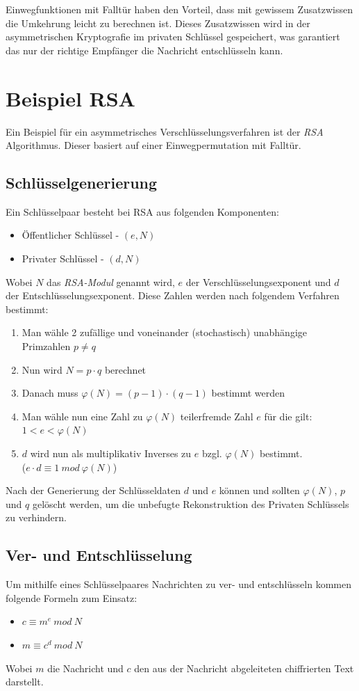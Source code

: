 \documentclass[11pt,a4paper]{scrreprt}
\begin{document}
Einwegfunktionen mit Falltür haben den Vorteil, dass mit gewissem Zusatzwissen die Umkehrung leicht zu berechnen ist. Dieses Zusatzwissen wird in der asymmetrischen Kryptografie im privaten Schlüssel gespeichert, was garantiert das nur der richtige Empfänger die Nachricht entschlüsseln kann.


\section{Beispiel RSA}
Ein Beispiel für ein asymmetrisches Verschlüsselungsverfahren ist der \textit{RSA} Algorithmus. Dieser basiert auf einer Einwegpermutation mit Falltür. 

\subsection{Schlüsselgenerierung}
Ein Schlüsselpaar besteht bei RSA aus folgenden Komponenten:
\begin{itemize}
\item Öffentlicher Schlüssel - $(e,N)$
\item Privater Schlüssel - $(d,N)$
\end{itemize}

Wobei $N$ das \textit{RSA-Modul} genannt wird, $e$ der Verschlüsselungsexponent und $d$ der Entschlüsselungsexponent. Diese Zahlen werden nach folgendem Verfahren bestimmt:
\begin{enumerate}
\item Man wähle 2 zufällige und voneinander (stochastisch) unabhängige Primzahlen $p\neq q$
\item Nun wird $N = p \cdot q$ berechnet
\item Danach muss $\varphi(N) = (p-1)\cdot(q-1)$ bestimmt werden
\item Man wähle nun eine Zahl zu $\varphi(N)$ teilerfremde Zahl $e$ für die gilt: $1<e<\varphi(N)$
\item $d$ wird nun als multiplikativ Inverses zu $e$ bzgl. $\varphi(N)$ bestimmt.
\\($e \cdot d \equiv 1 ~mod~ \varphi(N)$)
\end{enumerate} 
Nach der Generierung der Schlüsseldaten $d$ und $e$ können und sollten $\varphi(N)$, $p$ und $q$ gelöscht werden, um die unbefugte Rekonstruktion des Privaten Schlüssels zu verhindern. 

\subsection{Ver- und Entschlüsselung}
Um mithilfe eines Schlüsselpaares Nachrichten zu ver- und entschlüsseln kommen folgende Formeln zum Einsatz:
\begin{itemize}
\item $c \equiv m^e ~mod~  N$
\item $m \equiv c^d ~mod~  N$
\end{itemize}
Wobei $m$ die Nachricht und $c$ den aus der Nachricht abgeleiteten chiffrierten Text darstellt.
\end{document}
